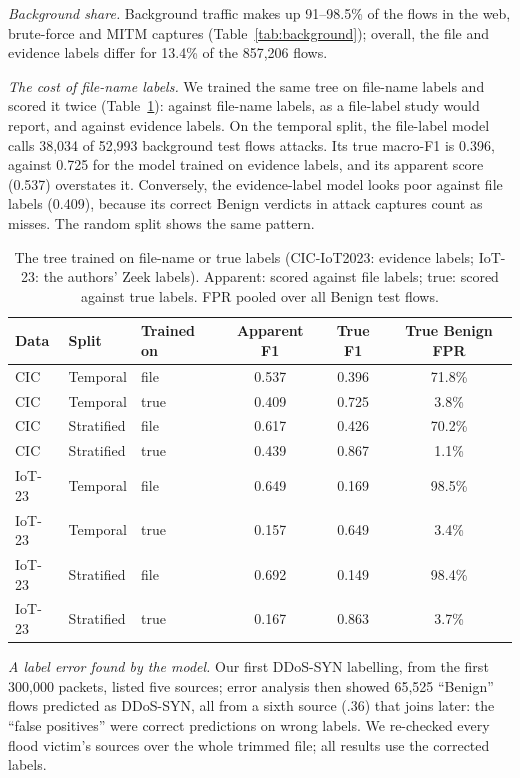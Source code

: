 \emph{Background share.} Background traffic makes up 91--98.5\% of the flows in the web, brute-force and MITM captures (Table~\ref{tab:background}); overall, the file and evidence labels differ for 13.4\% of the 857,206 flows.

\emph{The cost of file-name labels.} We trained the same tree on file-name labels and scored it twice (Table~\ref{tab:filelabel}): against file-name labels, as a file-label study would report, and against evidence labels. On the temporal split, the file-label model calls 38,034 of 52,993 background test flows attacks. Its true macro-F1 is 0.396, against 0.725 for the model trained on evidence labels, and its apparent score (0.537) overstates it. Conversely, the evidence-label model looks poor against file labels (0.409), because its correct Benign verdicts in attack captures count as misses. The random split shows the same pattern.

\begin{table}[t]
\centering
\caption{The tree trained on file-name or true labels (CIC-IoT2023: evidence labels; IoT-23: the authors' Zeek labels). Apparent: scored against file labels; true: scored against true labels. FPR pooled over all Benign test flows.}
\label{tab:filelabel}
\footnotesize
\setlength{\tabcolsep}{3pt}
\begin{tabular}{lllccc}
\hline
Data & Split & Trained on & Apparent F1 & True F1 & True Benign FPR \\
\hline
CIC & Temporal   & file & 0.537 & 0.396 & 71.8\% \\
CIC & Temporal   & true & 0.409 & 0.725 & 3.8\% \\
CIC & Stratified & file & 0.617 & 0.426 & 70.2\% \\
CIC & Stratified & true & 0.439 & 0.867 & 1.1\% \\
\hline
IoT-23 & Temporal   & file & 0.649 & 0.169 & 98.5\% \\
IoT-23 & Temporal   & true & 0.157 & 0.649 & 3.4\% \\
IoT-23 & Stratified & file & 0.692 & 0.149 & 98.4\% \\
IoT-23 & Stratified & true & 0.167 & 0.863 & 3.7\% \\
\hline
\end{tabular}
\end{table}

\emph{A label error found by the model.} Our first DDoS-SYN labelling, from the first 300,000 packets, listed five sources; error analysis then showed 65,525 ``Benign'' flows predicted as DDoS-SYN, all from a sixth source (.36) that joins later: the ``false positives'' were correct predictions on wrong labels. We re-checked every flood victim's sources over the whole trimmed file; all results use the corrected labels.

